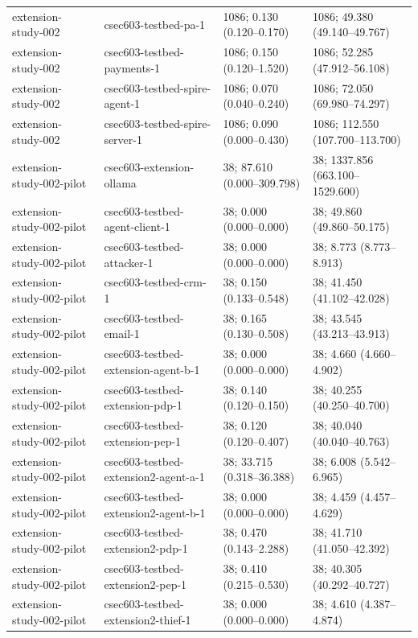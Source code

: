 \begin{tabular}{llll}
extension-study-002 & csec603-testbed-pa-1 & 1086; 0.130 (0.120--0.170) & 1086; 49.380 (49.140--49.767) \\
extension-study-002 & csec603-testbed-payments-1 & 1086; 0.150 (0.120--1.520) & 1086; 52.285 (47.912--56.108) \\
extension-study-002 & csec603-testbed-spire-agent-1 & 1086; 0.070 (0.040--0.240) & 1086; 72.050 (69.980--74.297) \\
extension-study-002 & csec603-testbed-spire-server-1 & 1086; 0.090 (0.000--0.430) & 1086; 112.550 (107.700--113.700) \\
extension-study-002-pilot & csec603-extension-ollama & 38; 87.610 (0.000--309.798) & 38; 1337.856 (663.100--1529.600) \\
extension-study-002-pilot & csec603-testbed-agent-client-1 & 38; 0.000 (0.000--0.000) & 38; 49.860 (49.860--50.175) \\
extension-study-002-pilot & csec603-testbed-attacker-1 & 38; 0.000 (0.000--0.000) & 38; 8.773 (8.773--8.913) \\
extension-study-002-pilot & csec603-testbed-crm-1 & 38; 0.150 (0.133--0.548) & 38; 41.450 (41.102--42.028) \\
extension-study-002-pilot & csec603-testbed-email-1 & 38; 0.165 (0.130--0.508) & 38; 43.545 (43.213--43.913) \\
extension-study-002-pilot & csec603-testbed-extension-agent-b-1 & 38; 0.000 (0.000--0.000) & 38; 4.660 (4.660--4.902) \\
extension-study-002-pilot & csec603-testbed-extension-pdp-1 & 38; 0.140 (0.120--0.150) & 38; 40.255 (40.250--40.700) \\
extension-study-002-pilot & csec603-testbed-extension-pep-1 & 38; 0.120 (0.120--0.407) & 38; 40.040 (40.040--40.763) \\
extension-study-002-pilot & csec603-testbed-extension2-agent-a-1 & 38; 33.715 (0.318--36.388) & 38; 6.008 (5.542--6.965) \\
extension-study-002-pilot & csec603-testbed-extension2-agent-b-1 & 38; 0.000 (0.000--0.000) & 38; 4.459 (4.457--4.629) \\
extension-study-002-pilot & csec603-testbed-extension2-pdp-1 & 38; 0.470 (0.143--2.288) & 38; 41.710 (41.050--42.392) \\
extension-study-002-pilot & csec603-testbed-extension2-pep-1 & 38; 0.410 (0.215--0.530) & 38; 40.305 (40.292--40.727) \\
extension-study-002-pilot & csec603-testbed-extension2-thief-1 & 38; 0.000 (0.000--0.000) & 38; 4.610 (4.387--4.874) \\

\end{tabular}

